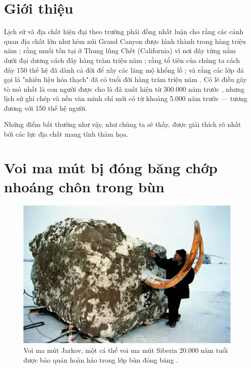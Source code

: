 \documentclass[10pt,twocolumn,letterpaper]{article}
\begin{document}

\section{Giới thiệu}

Lịch sử và địa chất hiện đại theo trường phái đồng nhất luận cho rằng các cảnh quan địa chất lớn như hẻm núi Grand Canyon được hình thành trong hàng triệu năm \cite{143}; rằng muối tồn tại ở Thung lũng Chết (California) vì nơi đây từng nằm dưới đại dương cách đây hàng trăm triệu năm \cite{144}; rằng tổ tiên của chúng ta cách đây 150 thế hệ đã dành cả đời để xây các lăng mộ khổng lồ \cite{29,70}; và rằng các lớp đá gọi là "nhiên liệu hóa thạch" đã có tuổi đời hàng trăm triệu năm \cite{104}. Có lẽ điều gây tò mò nhất là con người được cho là đã xuất hiện từ 300.000 năm trước \cite{145}, nhưng lịch sử ghi chép và nền văn minh chỉ mới có từ khoảng 5.000 năm trước — tương đương với 150 thế hệ người.

Những điểm bất thường như vậy, như chúng ta sẽ thấy, được giải thích rõ nhất bởi các lực địa chất mang tính thảm họa.

\section{Voi ma mút bị đóng băng chớp nhoáng chôn trong bùn}

\begin{figure}[b]
\begin{center}
   \includegraphics[width=1\linewidth]{jarkov-mammoth.jpg}
\end{center}
   \caption{Voi ma mút Jarkov, một cá thể voi ma mút Siberia 20.000 năm tuổi được bảo quản hoàn hảo trong lớp bùn đóng băng \cite{51}.}
\label{fig:1}
\label{fig:onecol}
\end{figure}
\end{document}
